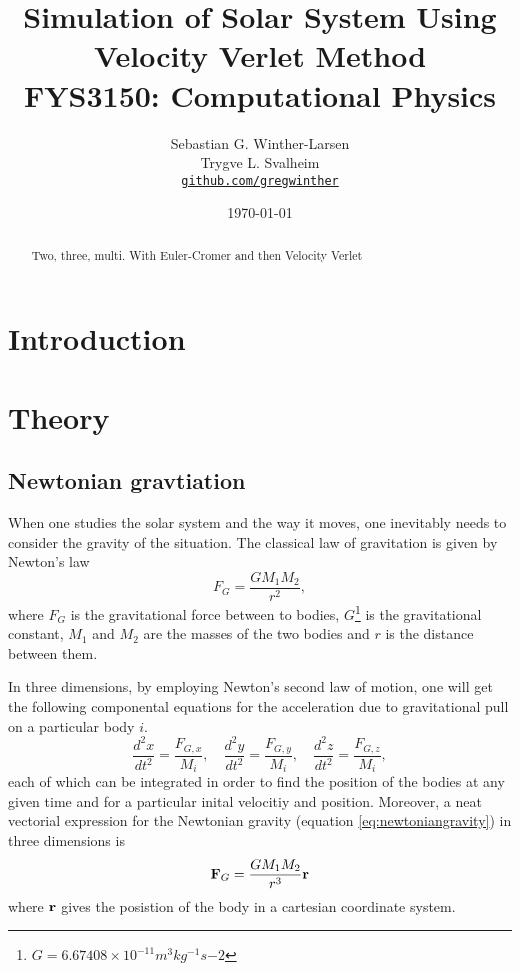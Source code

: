 \documentclass[10pt, a4paper]{amsart}
\title[Simulation of Solar System]{Simulation of Solar System Using Velocity Verlet Method \\
  \hrulefill\small{ FYS3150: Computational Physics }\hrulefill}
\author[Winther-Larsen \& Svalheim]{Sebastian G. Winther-Larsen \\ 
Trygve L. Svalheim \\
\href{https://github.com/gregwinther/FYS3150/}{\texttt{github.com/gregwinther}}}
\date{\today}
\begin{document}
\begin{titlepage}
\begin{abstract}
Two, three, multi. With Euler-Cromer and then Velocity Verlet
\end{abstract}
\maketitle
\tableofcontents
\end{titlepage}

\section{Introduction}

\section{Theory}

\subsection{Newtonian gravtiation}
When one studies the solar system and the way it moves, one inevitably needs to consider the gravity of the situation. The classical law of gravitation is given by Newton's law
\begin{equation}
\label{eq:newtoniangravity}
F_G = \frac{GM_1M_2}{r^2},
\end{equation} 
where $F_G$ is the gravitational force between to bodies, $G$\footnote{$G=6.67408 \times 10^{-11} m^3 kg^{-1} s{-2}$} is the gravitational constant, $M_1$ and $M_2$ are the masses of the two bodies and $r$ is the distance between them.

In three dimensions, by employing Newton's second law of motion, one will get the following componental equations for the acceleration due to gravitational pull on a particular body $i$.
\begin{equation}
\label{eq:componentalnewton}
\frac{d^2x}{dt^2} = \frac{F_{G,x}}{M_i}, \quad
\frac{d^2y}{dt^2} = \frac{F_{G,y}}{M_i}, \quad
\frac{d^2z}{dt^2} = \frac{F_{G,z}}{M_i},
\end{equation}
each of which can be integrated in order to find the position of the bodies at any given time and for a particular inital velocitiy and position. Moreover, a neat vectorial expression for the Newtonian gravity (equation \ref{eq:newtoniangravity}) in three dimensions is
\begin{equation}
\vb{F}_G = \frac{GM_1M_2}{r^3}\vb{r}
\end{equation}
where $\vb{r}$ gives the posistion of the body in a cartesian coordinate system.
\end{document}
